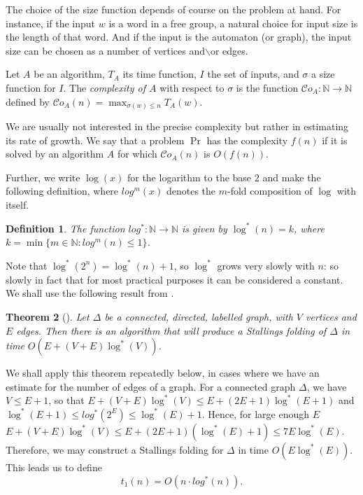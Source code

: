 \documentclass[a4paper,12pt]{article}
\newcommand{\D}{\Delta }
\newtheorem{theorem}{Theorem}[section]
\newtheorem{definition}[theorem]{Definition}
\numberwithin{equation}{section}
\numberwithin{figure}{section}
\newcommand{\NN}{\ensuremath{\mathbb{N}}}
\newcommand{\cC}{\mathcal{C}}
\newcommand{\maps}{\rightarrow}
\begin{document}
The choice of the size function depends of course on the problem at hand.
For instance, if the input $w$ is a word in a free group, a natural choice for input size is the length of that word. And if the input is the automaton (or graph), the input size can be chosen as a number of vertices and{$\backslash$}or edges.

Let $A$ be an algorithm, $T_{A}$ its time function, $I$ the set of
inputs, and $\sigma$ a size function for $I$. The \emph{ complexity of $A$} with respect to $\sigma$ is the function
$\cC o_{A}:\NN \to \NN$ defined by $\cC o_{A}(n)=\max_{\sigma(w)\le n}
T_{A}(w)$.

We are usually not interested in the precise complexity
but rather in estimating its rate of growth. We say that a problem
$\Pr$ has the complexity $f(n)$ if it is solved by an
algorithm $A$ for which $\cC o_{A}(n)$ is $O(f(n))$.

Further, we write $\log(x)$ for the logarithm to the base $2$ and make the
following definition, where $log^m(x)$ denotes the $m$-fold composition
of $\log$ with itself.
\begin{definition}\label{def:log}
The function $log^*:\NN\maps \NN$ is given by $\log^*(n)=k$, where
$k=\min\{m\in \NN: log^m(n)\le 1\}$.
\end{definition}
Note that $\log^*(2^n)=\log^*(n)+1$, so $\log^*$ grows very slowly with $n$:
so slowly in fact that for most practical purposes it can be
considered a constant.
We shall use the following result from \cite{touikan06}.
\begin{theorem}[{\cite[Theorem 1.6]{touikan06}}]%
Let $\D$ be a connected, directed, labelled graph, with $V$ vertices and
$E$ edges. Then there is an algorithm that will produce a Stallings folding of
$\D$ in time $O(E+(V+E)\log^*(V))$.
\end{theorem}

We shall apply this theorem repeatedly below, in cases where we
have an estimate for the number of edges of a graph. For a
connected graph $\D$, we have $V\le E+1$, so that
$E+(V+E)\log^*(V)\le E+(2E+1)\log^*(E+1)$ and $\log^*(E+1)\le
log^*(2^E)\le \log^*(E)+1$. Hence, for large enough $E$
$E+(V+E)\log^*(V)\le E+(2E+1)(\log^*(E)+1)\le 7E\log^*(E)$.
Therefore, we may construct a Stallings folding for $\D$ in time
$O(E\log^*(E))$. This leads us to define
\begin{equation}\label{t1} t_1(n) = O (n \cdot log^{\ast}(n)).
\end{equation}
\end{document}
